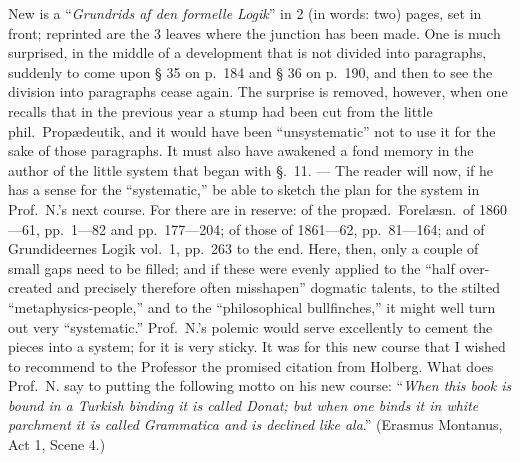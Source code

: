 \documentclass[12pt,a4paper]{book}
\begin{document}
New is a ``\emph{Grundrids af den formelle Logik}'' in 2 (in words: two) pages,
set in front; reprinted are the 3 leaves where the junction has been made. One is
much surprised, in the middle of a development that is not divided into
paragraphs, suddenly to come upon § 35 on p.\ 184 and § 36 on p.\ 190, and then
to see the division into paragraphs cease again. The surprise is removed,
however, when one recalls that in the previous year a stump had been cut from the
little phil.\ Propædeutik, and it would have been ``unsystematic'' not to use it
for the sake of those paragraphs. It must also have awakened a fond memory in the
author of the little system that began with §.\ 11. --- The reader will now, if he
has a sense for the ``systematic,'' be able to sketch the plan for the system in
Prof.\ N.'s next course. For there are in reserve: of the propæd.\ Forelæsn.\ of
1860---61, pp.\ 1---82 and pp.\ 177---204; of those of 1861---62, pp.\ 81---164;
and of Grundideernes Logik vol.\ 1, pp.\ 263 to the end. Here, then, only a couple
of small gaps need to be filled; and if these were evenly applied to the ``half
over-created and precisely therefore often misshapen'' dogmatic talents, to the
stilted ``metaphysics-people,'' and to the ``philosophical bullfinches,'' it might
well turn out very ``systematic.'' Prof.\ N.'s polemic would serve excellently to
cement the pieces into a system; for it is very sticky. It was for this new course
that I wished to recommend to the Professor the promised citation from Holberg.
What does Prof.\ N. say to putting the following motto on his new course:
``\emph{When this book is bound in a Turkish binding it is called \textit{Donat};
but when one binds it in white parchment it is called \textit{Grammatica} and is
declined like \textit{ala}}.'' (Erasmus Montanus, Act 1, Scene 4.)
\end{document}
